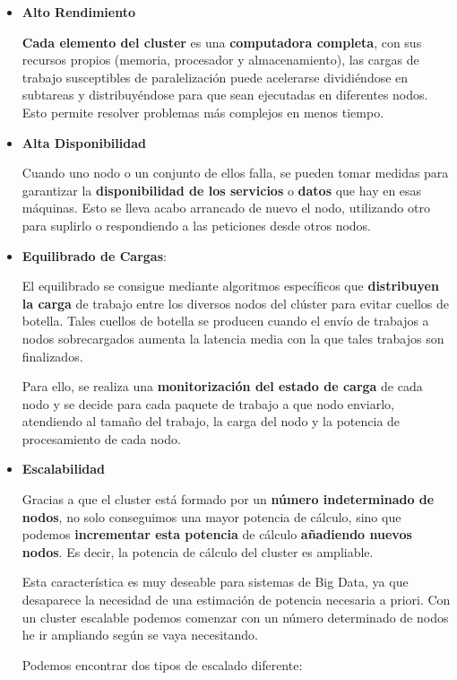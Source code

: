 \begin{itemize}
	\item \textbf{Alto Rendimiento}
	
	\textbf{Cada elemento del cluster} es una \textbf{computadora completa}, con sus recursos propios (memoria, procesador y almacenamiento), las cargas de trabajo susceptibles de paralelización puede acelerarse dividiéndose en subtareas y distribuyéndose para que sean ejecutadas en diferentes nodos. Esto permite resolver problemas más complejos en menos tiempo.
	
	\item \textbf{Alta Disponibilidad}
	
	Cuando uno nodo o un conjunto de ellos falla, se pueden tomar medidas para garantizar la \textbf{disponibilidad de los servicios} o \textbf{datos} que hay en esas máquinas. Esto se lleva acabo arrancado de nuevo el nodo, utilizando otro para suplirlo o respondiendo a las peticiones desde otros nodos.
	
	\item \textbf{Equilibrado de Cargas}: 
	
	El equilibrado se consigue mediante algoritmos específicos que \textbf{distribuyen la carga} de trabajo entre los diversos nodos del clúster para evitar cuellos de botella. Tales cuellos de botella se producen cuando el envío de trabajos a nodos sobrecargados aumenta la latencia media con la que tales trabajos son finalizados. 
	
	Para ello, se realiza una \textbf{monitorización del estado de carga} de cada nodo y se decide para cada paquete de trabajo a que nodo enviarlo, atendiendo al tamaño del trabajo, la carga del nodo y la potencia de procesamiento de cada nodo. 
	
	\item \textbf{Escalabilidad}
	
	Gracias a que el cluster está formado por un \textbf{número indeterminado de nodos}, no solo conseguimos una mayor potencia de cálculo, sino que podemos \textbf{incrementar esta potencia} de cálculo \textbf{añadiendo nuevos nodos}. Es decir, la potencia de cálculo del cluster es ampliable. 
	
	Esta característica es muy deseable para sistemas de Big Data, ya que desaparece la necesidad de una estimación de potencia necesaria a priori. Con un cluster escalable podemos comenzar con un número determinado de nodos he ir ampliando según se vaya necesitando. 
	
	Podemos encontrar dos tipos de escalado diferente:
	

\end{itemize}
